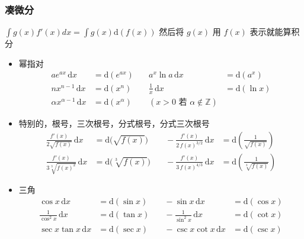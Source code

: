 \documentclass[lang=cn,newtx,10pt,scheme=chinese]{elegantbook}
\begin{document}
    \subsubsection{凑微分}
$\int g(x) f'(x) dx = \int g(x) \mathrm{d}(f(x))$
然后将 $g(x)$ 用 $f(x)$ 表示就能算积分


    \begin{itemize}
  \item 幂指对 
  \begin{equation}
    \begin{aligned}
      ae^{ax}\,\mathrm{d}x &= \mathrm{d}(e^{ax}) & \quad a^{x}\ln a\,\mathrm{d}x &= \mathrm{d}(a^{x}) \\
      n x^{n-1}\,\mathrm{d}x &= \mathrm{d}(x^{n}) & \quad \frac{1}{x}\,\mathrm{d}x &= \mathrm{d}(\ln x)\\
      \alpha x^{\alpha-1}\,\mathrm{d}x &= \mathrm{d}(x^{\alpha}) &\quad (x>0\text{ 若 }\alpha\notin\mathbb{Z})&
    \end{aligned}
  \end{equation}

  \item 特别的，根号，三次根号，分式根号，分式三次根号
  \begin{equation}
    \begin{aligned}
      \frac{f'(x)}{2\sqrt{f(x)}}\,\mathrm{d}x &= \mathrm{d}\big(\sqrt{f(x)}\big) &\quad -\frac{f'(x)}{2\,f(x)^{3/2}}\,\mathrm{d}x &= \mathrm{d}\!\left(\frac{1}{\sqrt{f(x)}}\right) \\
      \frac{f'(x)}{3\sqrt[3]{f(x)^{2}}}\,\mathrm{d}x &= \mathrm{d}\big(\sqrt[3]{f(x)}\big) &\quad -\frac{f'(x)}{3\,f(x)^{4/3}}\,\mathrm{d}x &= \mathrm{d}\!\left(\frac{1}{\sqrt[3]{f(x)}}\right)
    \end{aligned}
  \end{equation}

  \item 三角
  \begin{equation}
    \begin{aligned}
      \cos x\,\mathrm{d}x &= \mathrm{d}(\sin x) &\quad -\sin x\,\mathrm{d}x &= \mathrm{d}(\cos x) \\
      \frac{1}{\cos^{2}x}\,\mathrm{d}x &= \mathrm{d}(\tan x) &\quad -\frac{1}{\sin^{2}x}\,\mathrm{d}x &= \mathrm{d}(\cot x) \\
      \sec x\tan x\,\mathrm{d}x &= \mathrm{d}(\sec x) &\quad -\csc x\cot x\,\mathrm{d}x &= \mathrm{d}(\csc x)
    \end{aligned}
  \end{equation}


\end{itemize}
\end{document}
